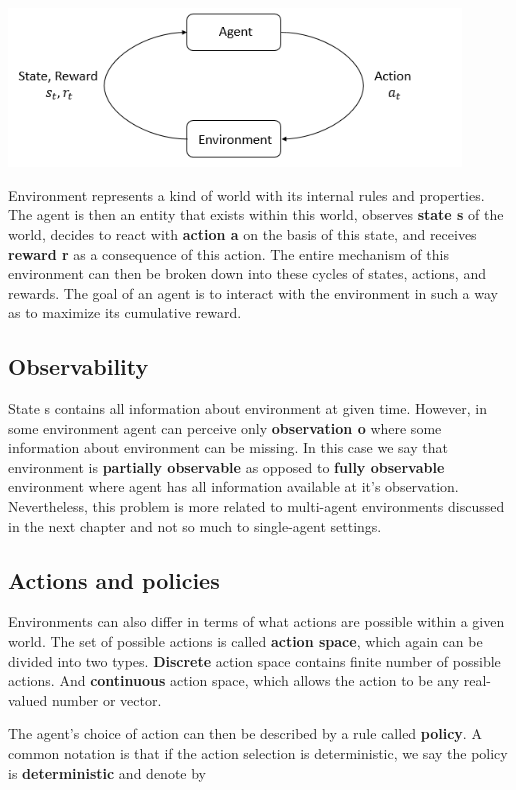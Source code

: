 \includegraphics*[width=12cm]{rl_diagram_transparent_bg.png}

Environment represents a kind of world with its internal rules and properties. 
The agent is then an entity that exists within this world, observes \textbf{state s} of the world, decides to react with \textbf{action a} on the basis of this state, and receives \textbf{reward r} as a consequence of this action.
The entire mechanism of this environment can then be broken down into these cycles of states, actions, and rewards.
The goal of an agent is to interact with the environment in such a way as to maximize its cumulative reward.



\subsection*{Observability}
State s contains all information about environment at given time. 
However, in some environment agent can perceive only \textbf{observation o} where some information about environment can be missing.
In this case we say that environment is \textbf{partially observable} as opposed to \textbf{fully observable} environment where agent has all information available at it's observation.
Nevertheless, this problem is more related to multi-agent environments discussed in the next chapter and not so much to single-agent settings.

\subsection*{Actions and policies}
Environments can also differ in terms of what actions are possible within a given world.
The set of possible actions is called \textbf{action space}, which again can be divided into two types. 
\textbf{Discrete} action space contains finite number of possible actions. 
And \textbf{continuous} action space, which allows the action to be any real-valued number or vector.

The agent's choice of action can then be described by a rule called \textbf{policy}. 
A common notation is that if the action selection is deterministic, we say the policy is \textbf{deterministic} and denote by


